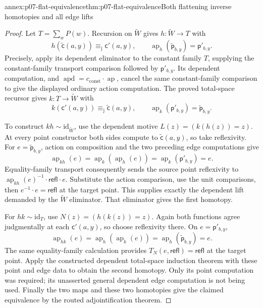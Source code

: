\begin{annexitem}{annex:p07-flat-equivalence}{thm:p07-flat-equivalence}{Both flattening inverse homotopies and all edge lifts}
\begin{proof}
Let \(T=\sum_wP(w)\).
Recursion on \(\widetilde W\) gives \(h:\widetilde W\to T\)
with
\[
h(\widetilde{\mathsf c}(a,y))
  \equiv_{\mathrm j}\mathsf c'(a,y),\qquad
\operatorname{ap}_h(\widetilde{\mathsf p}_{b,y})
  =\mathsf p'_{b,y}.
\]
Precisely, apply its dependent eliminator to the constant family \(T\),
supplying the constant-family transport comparison followed by
\(\mathsf p'_{b,y}\). Its dependent computation, and
\(\operatorname{apd}=c_{\mathrm{const}}\cdot\operatorname{ap}\),
cancel the same constant-family comparison to give the displayed
ordinary action computation.
The proved total-space recursor gives \(k:T\to\widetilde W\) with
\[
k(\mathsf c'(a,y))\equiv_{\mathrm j}\widetilde{\mathsf c}(a,y),
\qquad \operatorname{ap}_k(\mathsf p'_{b,y})
  =\widetilde{\mathsf p}_{b,y}.
\]

To construct \(kh\sim\mathrm{id}_{\widetilde W}\), use the
dependent motive \(L(z)=(k(h(z))=z)\).
At every point constructor both sides compute to
\(\widetilde{\mathsf c}(a,y)\), so take reflexivity.
For \(e=\widetilde{\mathsf p}_{b,y}\), action on composition and
the two preceding edge computations give
\[
\operatorname{ap}_{kh}(e)
 =\operatorname{ap}_k(\operatorname{ap}_h(e))
 =\operatorname{ap}_k(\mathsf p'_{b,y})
 =e.
\]
Equality-family transport consequently sends the source point
reflexivity to
\(\operatorname{ap}_{kh}(e)^{-1}\cdot\mathsf{refl}\cdot e\).
Substitute the action comparison, use the unit comparisons, then
\(e^{-1}\cdot e=\mathsf{refl}\) at the target point.
This supplies exactly the dependent lift demanded by the
\(\widetilde W\) eliminator. That eliminator gives the first homotopy.

For \(hk\sim\mathrm{id}_T\), use \(N(z)=(h(k(z))=z)\).
Again both functions agree judgmentally at each \(\mathsf c'(a,y)\),
so choose reflexivity there. On \(e=\mathsf p'_{b,y}\),
\[
\operatorname{ap}_{hk}(e)
 =\operatorname{ap}_h(\operatorname{ap}_k(e))
 =\operatorname{ap}_h(\widetilde{\mathsf p}_{b,y})
 =e.
\]
The same equality-family calculation provides
\(T_N(e,\mathsf{refl})=\mathsf{refl}\) at the target point.
Apply the constructed dependent total-space induction theorem with
these point and edge data to obtain the second homotopy.
Only its point computation was required; its unasserted general
dependent edge computation is not being used.
Finally the two maps and these two homotopies give the claimed
equivalence by the routed adjointification theorem.
\end{proof}
\end{annexitem}

